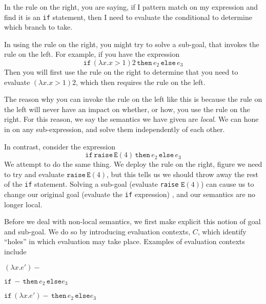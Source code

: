 In the rule on the right, you are saying, if I pattern match on my expression and find it is an \texttt{if} statement, then I need to evaluate the conditional to determine which branch to take. 

In using the rule on the right, you might try to solve a sub-goal, that invokes the rule on the left. For example, if you have the expression
\[\texttt{if} \, (\lambda x. x>1)2 \, \texttt{then} \, e_2 \, \texttt{else} \, e_3\]
Then you will first use the rule on the right to determine that you need to evaluate $(\lambda x. x>1)2$, which then requires the rule on the left. 

The reason why you can invoke the rule on the left like this is because the rule on the left will never have an impact on whether, or how, you use the rule on the right. For this reason, we say the semantics we have given are \textit{local}. We can hone in on any sub-expression, and solve them independently of each other. 

In contrast, consider the expression
\[\texttt{if} \, \texttt{raise} \, \texttt{E}(4)\, \texttt{then} \, e_2 \, \texttt{else} \, e_3\]
We attempt to do the same thing. We deploy the rule on the right, figure we need to try and evaluate $\texttt{raise} \, \texttt{E}(4)$, but this tells us we should throw away the rest of the \texttt{if} statement. Solving a sub-goal (evaluate \texttt{raise} $\texttt{E}(4)$) can cause us to change our original goal (evaluate the \texttt{if} expression) , and our semantics are no longer local. 

Before we deal with non-local semantics, we first make explicit this notion of goal and sub-goal. We do so by introducing evaluation contexts, $C$, which identify ``holes'' in which evaluation may take place. Examples of evaluation contexts include 

\begin{minipage}{0.33\textwidth}
    \begin{center}
        $(\lambda x. e') -$
    \end{center}
\end{minipage}%
\begin{minipage}{0.33\textwidth}
    \begin{center}
        $\texttt{if}\, - \, \texttt{then}\, e_2 \, \texttt{else} e_3$
    \end{center}
\end{minipage}%
\begin{minipage}{0.33\textwidth}
    \begin{center}
        $\texttt{if}\, (\lambda x. e') - \, \texttt{then}\, e_2 \, \texttt{else} e_3$
    \end{center}
\end{minipage}%

